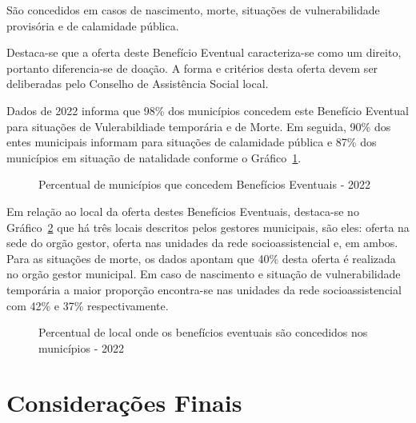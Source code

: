 \documentclass[
  letterpaper,
  DIV=11,
  numbers=noendperiod]{scrreprt}
\begin{document}
São concedidos em casos de nascimento, morte, situações de
vulnerabilidade provisória e de calamidade pública.

Destaca-se que a oferta deste Benefício Eventual caracteriza-se como um
direito, portanto diferencia-se de doação. A forma e critérios desta
oferta devem ser deliberadas pelo Conselho de Assistência Social local.

Dados de 2022 informa que 98\% dos municípios concedem este Benefício
Eventual para situações de Vulerabildiade temporária e de Morte. Em
seguida, 90\% dos entes municipais informam para situações de calamidade
pública e 87\% dos municípios em situação de natalidade conforme o
Gráfico~\ref{fig-be-munic}.

\begin{figure}


\caption{\label{fig-be-munic}Percentual de municípios que concedem
Benefícios Eventuais - 2022}

\end{figure}%

Em relação ao local da oferta destes Benefícios Eventuais, destaca-se no
Gráfico~\ref{fig-be-local} que há três locais descritos pelos gestores
municipais, são eles: oferta na sede do orgão gestor, oferta nas
unidades da rede socioassistencial e, em ambos. Para as situações de
morte, os dados apontam que 40\% desta oferta é realizada no orgão
gestor municipal. Em caso de nascimento e situação de vulnerabilidade
temporária a maior proporção encontra-se nas unidades da rede
socioassistencial com 42\% e 37\% respectivamente.

\begin{figure}


\caption{\label{fig-be-local}Percentual de local onde os benefícios
eventuais são concedidos nos municípios - 2022}

\end{figure}%

\section{Considerações Finais}\label{considerauxe7uxf5es-finais-2}
\end{document}
